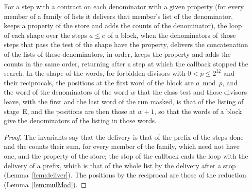 \begin{lemma}\label{lem:blockLoops}
  \leanok
  For a step with a contract on each denominator with a given property (for every member of a family
  of lists it delivers that member's list of the denominator, keeps a property of the store and adds
  the counts of the denominator), the loop of each shape over the steps $a \le e$ of a block, when
  the denominators of those steps that pass the test of the shape have the property, delivers the
  concatenation of the lists of these denominators, in order, keeps the property and adds the counts
  in the same order, returning after a step at which the callback stopped the search. In the shape
  of the words, for forbidden divisors with $0 < p \le 2^{32}$ and their reciprocals, the positions
  at the first word of the block are $a \bmod p$, and the word of the denominators of the word $w$
  that the class test and those divisors leave, with the first and the last word of the run masked,
  is that of the listing of stage~E, and the positions are then those at $w + 1$, so that the words
  of a block give the denominators of the listing in those words.
\end{lemma}

\begin{proof}
  \leanok
  The invariants say that the delivery is that of the prefix of the steps done and the counts their
  sum, for every member of the family, which need not have one, and the property of the store; the
  stop of the callback ends the loop with the delivery of a prefix, which is that of the whole list
  by the delivery after a stop (Lemma~\ref{lem:deliver}). The positions by the reciprocal are those
  of the reduction (Lemma~\ref{lem:mulMod}).
\end{proof}

